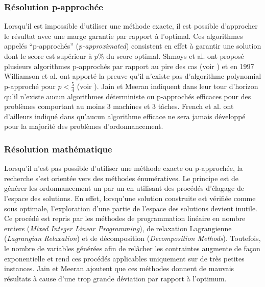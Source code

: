 \subsubsection{Résolution p-approchée}
Lorsqu'il est impossible d'utiliser une méthode exacte, il est possible d'approcher le résultat avec une marge garantie par rapport à l'optimal. Ces algorithmes appelés ``p-approchés'' (\textit{p-approximated}) consistent en effet à garantir une solution dont le score est supérieur à $p$\% du score optimal. Shmoys et al. ont proposé plusieurs algorithmes p-approchés par rapport au pire des cas (voir \cite{Shmoys1994}) et en 1997 Williamson et al. ont apporté la preuve qu'il n'existe pas d'algorithme polynomial p-approché pour $p < \frac{5}{4}$ (voir \cite{Williamson1997}). Jain et Meeran indiquent dans leur tour d'horizon qu'il n'existe aucun algorithmes déterministe ou p-approchés efficaces pour des problèmes comportant au moins 3 machines et 3 tâches. French et al. ont d'ailleurs indiqué dans \cite{French1982} qu'aucun algorithme efficace ne sera jamais développé pour la majorité des problèmes d'ordonnancement.

\subsubsection{Résolution mathématique} \label{resolutionMathematiqueJSSP}
Lorsqu'il n'est pas possible d'utiliser une méthode exacte ou p-approchée, la recherche s'est orientée vers des méthodes énumératives. Le principe est de générer les ordonnancement un par un en utilisant des procédés d'élagage de l'espace des solutions. En effet, lorsqu'une solution construite est vérifiée comme sous optimale, l'exploration d'une partie de l'espace des solutions devient inutile. Ce procédé est repris par les méthodes de programmation linéaire en nombre entiers (\textit{Mixed Integer Linear Programming}), de relaxation Lagrangienne (\textit{Lagrangian Relaxation}) et de décomposition (\textit{Decomposition Methods}). Toutefois, le nombre de variables générées afin de relâcher les contraintes augmente de façon exponentielle et rend ces procédés applicables uniquement sur de très petites instances. Jain et Meeran ajoutent que ces méthodes donnent de mauvais résultats à cause d'une trop grande déviation par rapport à l'optimum.

